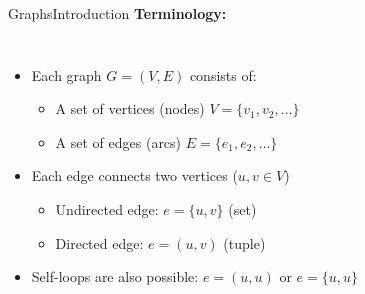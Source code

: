 \begin{frame}{Graphs}{Introduction}
  \textbf{Terminology:}
  \begin{columns}
    \begin{column}[b]{0.5\linewidth}
      \begin{figure}
        \begin{adjustbox}{width=0.75\linewidth}
          
        \end{adjustbox}
        \label{fig:graphs:introduction_undirected}
      \end{figure}
    \end{column}
    \begin{column}[b]{0.5\linewidth}
      \begin{figure}
        \begin{adjustbox}{width=0.75\linewidth}
          
        \end{adjustbox}
        \vspace{-1.0em}
        \label{fig:graphs:introduction_directed}
      \end{figure}
    \end{column}
  \end{columns}
  \begin{itemize}
    \item<3->
      Each graph {\color{MainA}$G = (V, E)$} consists of:
      \begin{itemize}
        \item<4->
          A set of vertices (nodes) {\color{MainA}$ V = \{v_1, v_2, \dotsc\}$}
        \item<5->
          A set of edges (arcs) {\color{MainA}$ E = \{e_1, e_2, \dotsc\}$}
       \end{itemize}
     \item<6->
       Each edge connects two vertices
       ({\color{MainA}$u, v \in V$})
       \begin{itemize}
         \item<7->
           Undirected edge: {\color{MainA}$e = \{u, v\}$} (set)
         \item<8->
           Directed edge: {\color{MainA}$e = (u, v)$} (tuple)
        \end{itemize}
      \item<9->
        Self-loops are also possible:
        {\color{MainA}$e = (u, u)$} or
        {\color{MainA}$e = \{u, u\}$}
  \end{itemize}
\end{frame}

